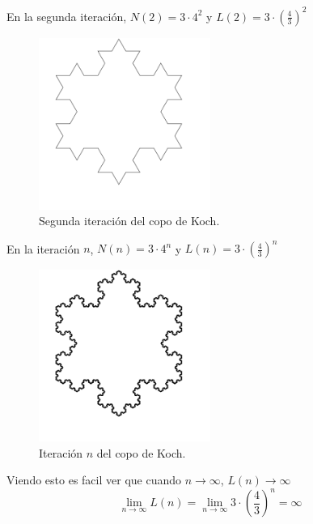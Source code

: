 \noindent En la segunda iteración, $N(2) = 3 \cdot 4^2$ y $L(2) = 3 \cdot \left(\frac{4}{3}\right)^2$\\

\begin{figure}[H]
    \centering
    \includegraphics[width=0.5\textwidth]{figures/koch-snowflake-iteration-2.png}
    \caption{Segunda iteración del copo de Koch.}
    \label{fig:koch-snowflake-iteration-2}
\end{figure}

\noindent En la iteración $n$, $N(n) = 3 \cdot 4^n$ y $L(n) = 3 \cdot \left(\frac{4}{3}\right)^n$\\

\begin{figure}[H]
    \centering
    \includegraphics[width=0.5\textwidth]{figures/koch-snowflake-iteration-n.png}
    \caption{Iteración $n$ del copo de Koch.}
    \label{fig:koch-snowflake-iteration-n}
\end{figure}

\noindent Viendo esto es facil ver que cuando $n \to \infty$, $L(n) \to \infty$\\

\begin{equation}
    \lim_{n \rightarrow \infty}L(n) = \lim_{n \rightarrow \infty} 3 \cdot \left(\frac{4}{3}\right)^n = \infty
\end{equation}

